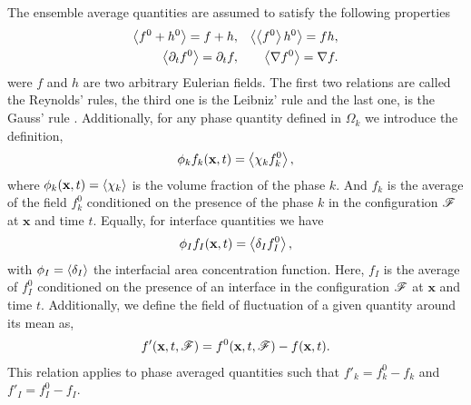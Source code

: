 The ensemble average quantities are assumed to satisfy the following properties \citep{drew1983mathematical}
\begin{align}
    \left<f^0+h^0\right> = f+h, 
    && \left<\left<f^0\right>h^0\right> = fh, \nonumber\\
    \left<\partial_t f^0\right> 
    = \partial_t f,  
    &&\left<\mathbf{\nabla} f^0\right>
    = \mathbf{\nabla} f. 
    \label{eq:avg_properties}
\end{align}
were $f$ and $h$ are two arbitrary Eulerian fields. 
The first two relations are called the Reynolds' rules, the third one is the Leibniz' rule and the last one, is the Gauss' rule \citep{drew1983mathematical}.
Additionally, for any phase quantity defined in $\Omega_k$ we introduce the definition, 
\begin{equation}
    \phi_k f_k (\textbf{x},t) = \left<\chi_k f_k^0\right>,
    \label{eq:1_avg}
\end{equation}
where $\phi_k(\textbf{x},t) = \left<\chi_k\right>$ is the volume fraction of the phase $k$.
And $f_k$ is the average of the field $f_k^0$ conditioned on the presence of the phase $k$ in the configuration $\mathscr{F}$ at $\textbf{x}$ and time $t$.
Equally, for interface quantities we have 
\begin{equation}
    \phi_I f_I (\textbf{x},t) = \left<\delta_I f_I^0\right>,
\end{equation}
with $\phi_I = \left<\delta_I\right>$ the interfacial area concentration function. 
Here, $f_I$ is the average of $f^0_I$ conditioned on the presence of an interface in the configuration $\mathscr{F}$ at $\textbf{x}$ and time $t$. 
Additionally, we define the field of fluctuation of a given quantity around its mean as,
\begin{align}
    f'(\textbf{x},t,\mathscr{F}) = f^0(\textbf{x},t,\mathscr{F}) - f(\textbf{x},t).
    \label{eq:def_fluctu}
\end{align}
This relation applies to phase averaged quantities such that $f'_k = f^0_k - f_k$ and $f'_I = f^0_I - f_I$. 


